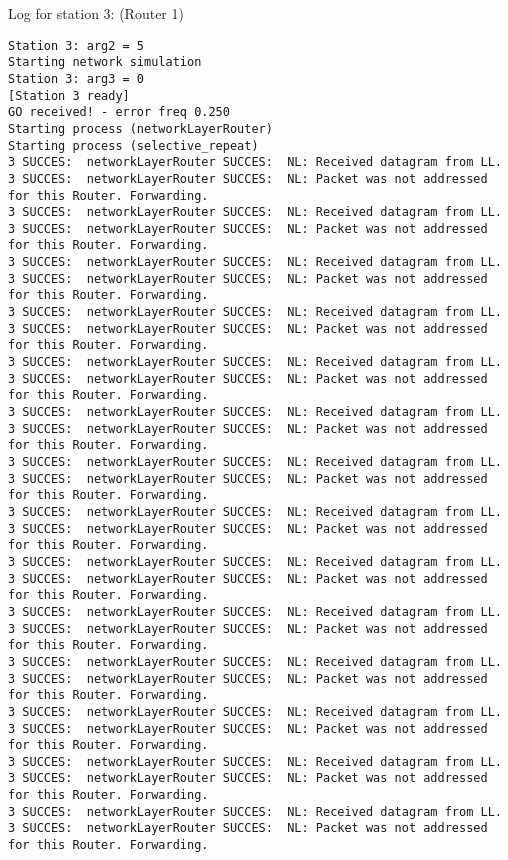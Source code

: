 Log for station 3: (Router 1)
\begin{lstlisting}[breaklines=true]
Station 3: arg2 = 5
Starting network simulation
Station 3: arg3 = 0
[Station 3 ready]
GO received! - error freq 0.250
Starting process (networkLayerRouter)
Starting process (selective_repeat)
3 SUCCES:  networkLayerRouter SUCCES:  NL: Received datagram from LL.
3 SUCCES:  networkLayerRouter SUCCES:  NL: Packet was not addressed for this Router. Forwarding.
3 SUCCES:  networkLayerRouter SUCCES:  NL: Received datagram from LL.
3 SUCCES:  networkLayerRouter SUCCES:  NL: Packet was not addressed for this Router. Forwarding.
3 SUCCES:  networkLayerRouter SUCCES:  NL: Received datagram from LL.
3 SUCCES:  networkLayerRouter SUCCES:  NL: Packet was not addressed for this Router. Forwarding.
3 SUCCES:  networkLayerRouter SUCCES:  NL: Received datagram from LL.
3 SUCCES:  networkLayerRouter SUCCES:  NL: Packet was not addressed for this Router. Forwarding.
3 SUCCES:  networkLayerRouter SUCCES:  NL: Received datagram from LL.
3 SUCCES:  networkLayerRouter SUCCES:  NL: Packet was not addressed for this Router. Forwarding.
3 SUCCES:  networkLayerRouter SUCCES:  NL: Received datagram from LL.
3 SUCCES:  networkLayerRouter SUCCES:  NL: Packet was not addressed for this Router. Forwarding.
3 SUCCES:  networkLayerRouter SUCCES:  NL: Received datagram from LL.
3 SUCCES:  networkLayerRouter SUCCES:  NL: Packet was not addressed for this Router. Forwarding.
3 SUCCES:  networkLayerRouter SUCCES:  NL: Received datagram from LL.
3 SUCCES:  networkLayerRouter SUCCES:  NL: Packet was not addressed for this Router. Forwarding.
3 SUCCES:  networkLayerRouter SUCCES:  NL: Received datagram from LL.
3 SUCCES:  networkLayerRouter SUCCES:  NL: Packet was not addressed for this Router. Forwarding.
3 SUCCES:  networkLayerRouter SUCCES:  NL: Received datagram from LL.
3 SUCCES:  networkLayerRouter SUCCES:  NL: Packet was not addressed for this Router. Forwarding.
3 SUCCES:  networkLayerRouter SUCCES:  NL: Received datagram from LL.
3 SUCCES:  networkLayerRouter SUCCES:  NL: Packet was not addressed for this Router. Forwarding.
3 SUCCES:  networkLayerRouter SUCCES:  NL: Received datagram from LL.
3 SUCCES:  networkLayerRouter SUCCES:  NL: Packet was not addressed for this Router. Forwarding.
3 SUCCES:  networkLayerRouter SUCCES:  NL: Received datagram from LL.
3 SUCCES:  networkLayerRouter SUCCES:  NL: Packet was not addressed for this Router. Forwarding.
3 SUCCES:  networkLayerRouter SUCCES:  NL: Received datagram from LL.
3 SUCCES:  networkLayerRouter SUCCES:  NL: Packet was not addressed for this Router. Forwarding.

\end{lstlisting}
